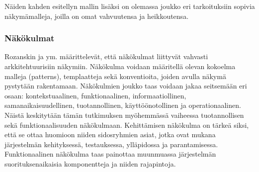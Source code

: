 \documentclass[finnish]{tktltiki2}
\theoremstyle{definition}
\theoremstyle{remark}
\begin{document}
Näiden kahden esitellyn mallin lisäksi on olemassa joukko eri tarkoituksiin sopivia näkymämalleja, joilla on omat vahvuutensa ja heikkoutensa. %



\subsubsection{Näkökulmat}
Rozanskin ja ym. \citep[s. 36-42]{Rozanski:2011:SSA:2072649} määrittelevät, että näkökulmat liittyvät vahvasti arkkitehtuurisiin näkymiin. Näkökulma voidaan määritellä olevan kokoelma malleja (patterns), templaatteja sekä konventioita, joiden avulla näkymä pystytään rakentamaan.  Näkökulmien joukko taas voidaan jakaa seitsemään eri osaan: kontekstuaalinen, funktionaalinen, informaatiollinen, samanaikaisuudellinen, tuotannollinen, käyttöönotollinen ja operationaalinen. Näistä keskitytään tämän tutkimuksen myöhemmässä vaiheessa tuotannollisen sekä funktionaalisuuden näkökulmaan. Kehittämisen näkökulma on tärkeä siksi, että se ottaa huomioon niiden sidosryhmien asiat, jotka ovat mukana järjestelmän kehityksessä, testauksessa, ylläpidossa ja parantamisessa. Funktionaalinen näkökulma taas painottaa muunmuassa järjestelmän suorituksenaikaisia komponentteja ja niiden rajapintoja.
\end{document}
